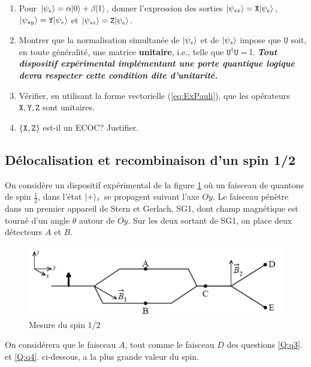 \begin{enumerate}
\item Pour $\vert\psi_{e}\rangle=\alpha\vert0\rangle+\beta\vert1\rangle$, donner l'expression des
sorties $\vert\psi_{sx}\rangle=\mathtt{X}\vert\psi_{e}\rangle$,
$\vert\psi_{sy}\rangle=\mathtt{Y}\vert\psi_{e}\rangle$ et
$\vert\psi_{sz}\rangle=\mathtt{Z}\vert\psi_{e}\rangle$.

\item Montrer que la normalisation simultanée de $\vert\psi_{e}\rangle$ et de
$\vert\psi_{s}\rangle$ impose que $\mathtt{U}$ soit, en toute généralité, une matrice
\textbf{unitaire}, i.e., telle que $\mathtt{U}^{\dag}\mathtt{U}=\mathbb{I}$.
\textbf{\emph{Tout dispositif expérimental implémentant une porte quantique
logique devra respecter cette condition dite d'unitarité.}}

\item Vérifier, en utilisant la forme vectorielle (\ref{eq:ExPauli}), que les
opérateurs $\mathtt{X},\mathtt{Y},\mathtt{Z}$ sont unitaires.

\item $\{\mathtt{X},\mathtt{Z}\}$ est-il un ECOC? Justifier.
\end{enumerate}

\subsection{Délocalisation et recombinaison d'un spin 1/2}

On considère un dispositif expérimental de la figure \ref{fig:MesureSpinEx2011}
où un faisceau de quantons de spin $\frac{1}{2}$, dans l'état $\vert+\rangle_{z}$ se
propagent suivant l'axe $Oy$. Le faisceau pénètre dans un premier appareil de
Stern et Gerlach, SG1, dont champ magnétique est tourné d'un angle $\theta$
autour de $Oy$. Sur les deux sortant de SG1, on place deux détecteurs $A$ et
$B$.

\begin{figure}[htpb]
\centering
\includegraphics{graphics/SpinREXMQ2005.pdf}
\caption{Mesure du spin 1/2}
\label{fig:MesureSpinEx2011}
\end{figure}

On considérera que le faisceau $A$, tout comme le faisceau $D$ des questions
\ref{Q:q3}. et \ref{Q:q4}. ci-dessous, a la plus grande valeur du spin.

